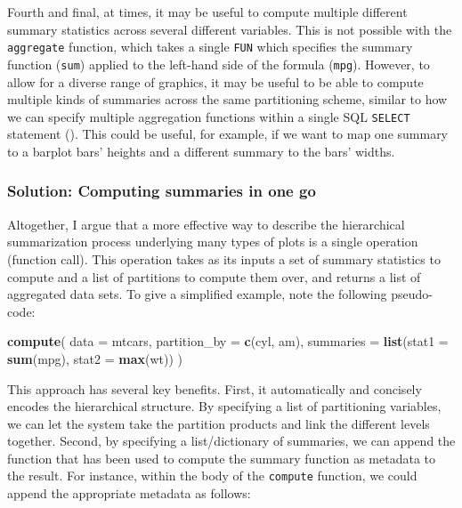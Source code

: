 \documentclass[
  openany]{book}
\newenvironment{Shaded}{\begin{snugshade}}{\end{snugshade}}
\newcommand{\AttributeTok}[1]{\textcolor[rgb]{0.13,0.29,0.53}{#1}}
\newcommand{\FunctionTok}[1]{\textcolor[rgb]{0.13,0.29,0.53}{\textbf{#1}}}
\newcommand{\NormalTok}[1]{#1}
\theoremstyle{definition}
\theoremstyle{definition}
\theoremstyle{definition}
\theoremstyle{definition}
\theoremstyle{remark}
\begin{document}
Fourth and final, at times, it may be useful to compute multiple different summary statistics across several different variables. This is not possible with the \texttt{aggregate} function, which takes a single \texttt{FUN} which specifies the summary function (\texttt{sum}) applied to the left-hand side of the formula (\texttt{mpg}). However, to allow for a diverse range of graphics, it may be useful to be able to compute multiple kinds of summaries across the same partitioning scheme, similar to how we can specify multiple aggregation functions within a single SQL \texttt{SELECT} statement (). This could be useful, for example, if we want to map one summary to a barplot bars' heights and a different summary to the bars' widths.

\subsubsection{Solution: Computing summaries in one go}\label{solution-computing-summaries-in-one-go}

Altogether, I argue that a more effective way to describe the hierarchical summarization process underlying many types of plots is a single operation (function call). This operation takes as its inputs a set of summary statistics to compute and a list of partitions to compute them over, and returns a list of aggregated data sets. To give a simplified example, note the following pseudo-code:

\begin{Shaded}
\begin{Highlighting}[]
\FunctionTok{compute}\NormalTok{(}
  \AttributeTok{data =}\NormalTok{ mtcars,}
  \AttributeTok{partition\_by =} \FunctionTok{c}\NormalTok{(cyl, am),}
  \AttributeTok{summaries =} \FunctionTok{list}\NormalTok{(}\AttributeTok{stat1 =} \FunctionTok{sum}\NormalTok{(mpg), }\AttributeTok{stat2 =} \FunctionTok{max}\NormalTok{(wt))}
\NormalTok{  )}
\end{Highlighting}
\end{Shaded}

This approach has several key benefits. First, it automatically and concisely encodes the hierarchical structure. By specifying a list of partitioning variables, we can let the system take the partition products and link the different levels together. Second, by specifying a list/dictionary of summaries, we can append the function that has been used to compute the summary function as metadata to the result. For instance, within the body of the \texttt{compute} function, we could append the appropriate metadata as follows:
\end{document}
